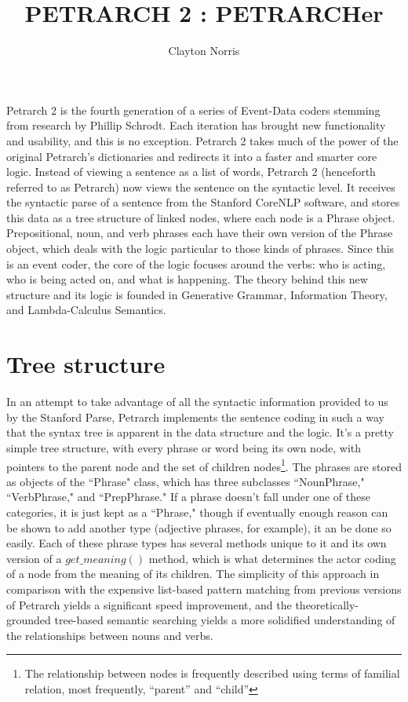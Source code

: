 \documentclass[11pt]{article}
\title{PETRARCH 2 : PETRARCHer}
\author{Clayton Norris}
\date{}
\begin{document}
\maketitle
Petrarch 2 is the fourth generation of a series of Event-Data coders stemming from research by 
Phillip Schrodt. Each iteration has brought new functionality and usability, and this is no exception.
Petrarch 2 takes much of the power of the original Petrarch's dictionaries and redirects it 
into a faster and smarter core logic. Instead of viewing a sentence as 
a list of words, Petrarch 2 (henceforth referred to as Petrarch) now views the sentence on the syntactic level. It 
receives the syntactic parse of a sentence from the Stanford CoreNLP 
software, and stores this data as a tree structure of linked nodes, 
where each node is a Phrase object. Prepositional, noun, and verb phrases each 
have their own version of the Phrase object, which deals with the logic 
particular to those kinds of phrases. Since this is an event coder, the core of 
the logic focuses around the verbs: who is acting, who is being acted on, and 
what is happening. The theory behind this new structure and its logic is founded 
in Generative Grammar, Information Theory, and Lambda-Calculus Semantics. 

\section{Tree structure}
In an attempt to take advantage of all the syntactic information provided to us 
by the Stanford Parse, Petrarch implements the sentence coding in such a way that 
the syntax tree is apparent in the data structure and the logic. It's a pretty simple tree 
structure, with every phrase or word being its own node, with pointers to the 
parent node and the set of children nodes\footnote{The relationship between nodes 
is frequently described using terms of familial relation, most frequently, ``parent'' and ``child''}. 
The phrases are stored as objects of the ``Phrase" 
class, which has three subclasses ``NounPhrase," ``VerbPhrase," and ``PrepPhrase." 
If a phrase doesn't fall under one of these categories, it is just kept as a 
``Phrase," though if eventually enough reason can be shown to add another type (adjective phrases, for example),
it an be done so easily. Each of these phrase types has several methods unique to it 
and its own version of a $get\_meaning()$ method, which is what determines the 
actor coding of a node from the meaning of its children. The simplicity of this approach in comparison 
with the expensive list-based pattern matching from previous versions of Petrarch yields a 
significant speed improvement, 
and the theoretically-grounded tree-based semantic searching yields a more  
solidified understanding of the relationships between nouns and verbs. 
\end{document}
